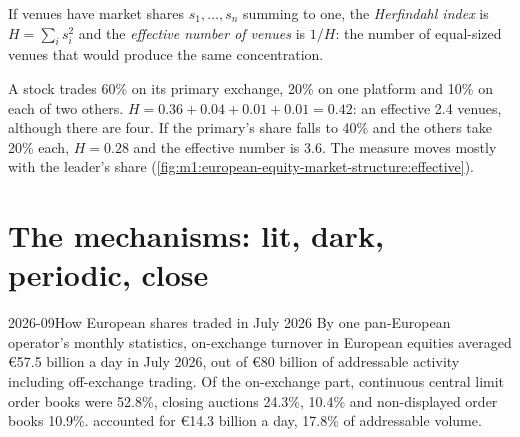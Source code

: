 \begin{definition}\label{def:m1:european-equity-market-structure:hhi}
If venues have market shares $s_1,\dots,s_n$ summing to one, the
\emph{Herfindahl index} is $H = \sum_i s_i^2$ and the \emph{effective number
of venues} is $1/H$: the number of equal-sized venues that would produce the
same concentration.
\end{definition}

\begin{example}\label{ex:m1:european-equity-market-structure:hhi}
A stock trades 60\% on its primary exchange, 20\% on one platform and 10\% on
each of two others. $H = 0.36 + 0.04 + 0.01 + 0.01 = 0.42$: an effective 2.4
venues, although there are four. If the primary's share falls to 40\% and the
others take 20\% each, $H = 0.28$ and the effective number is 3.6. The measure
moves mostly with the leader's share
(\cref{fig:m1:european-equity-market-structure:effective}).
\end{example}

\begin{omfigure}

\label{fig:m1:european-equity-market-structure:effective}
\end{omfigure}

\section{The mechanisms: lit, dark, periodic, close}

\begin{dated}{2026-09}{How European shares traded in July 2026}\label{dat:m1:european-equity-market-structure:july}
By one pan-European operator's monthly statistics, on-exchange turnover in
European equities averaged \euro 57.5 billion a day in July 2026, out of
\euro 80 billion of addressable activity including off-exchange trading. Of
the on-exchange part, continuous central limit order books were 52.8\%,
closing auctions 24.3\%,  10.4\% and non-displayed order
books 10.9\%.  accounted for \euro 14.3 billion a
day, 17.8\% of addressable volume.
\end{dated}

